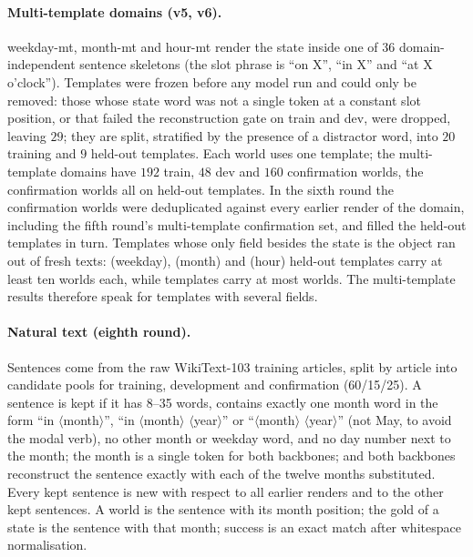 \paragraph{Multi-template domains (v5, v6).}
weekday-mt, month-mt and hour-mt render the state inside one of $36$ domain-independent sentence skeletons (the slot phrase is ``on X'',
``in X'' and ``at X o'clock''). Templates were frozen before any model run and could only be removed: those whose state word was not a single token at a constant slot position, or that failed the reconstruction gate on train and dev, were dropped, leaving $29$; they are split,
stratified by the presence of a distractor word, into $20$ training and $9$ held-out templates. Each world uses one template; the
multi-template domains have $192$ train, $48$ dev and $160$ confirmation worlds, the confirmation worlds all on held-out templates.
In the sixth round the confirmation worlds were deduplicated against every earlier render of the domain, including the fifth round's
multi-template confirmation set, and filled the held-out templates in turn. Templates whose only field besides the state is the object ran out of fresh
texts: \CLfourteenTmplWeekday{} (weekday), \CLfourteenTmplMonth{} (month) and \CLfourteenTmplHour{} (hour) held-out templates carry at
least ten worlds each, while \CLfourteenTmplSparse{} templates carry at most \CLfourteenTmplSparseMax{} worlds. The multi-template
results therefore speak for templates with several fields.

\paragraph{Natural text (eighth round).}
Sentences come from the raw WikiText-103 training articles, split by article into candidate pools for training, development and
confirmation (60/15/25). A sentence is kept if it has 8--35 words, contains exactly one month word in the form ``in $\langle$month$\rangle$'',
``in $\langle$month$\rangle$ $\langle$year$\rangle$'' or ``$\langle$month$\rangle$ $\langle$year$\rangle$'' (not May, to avoid the modal verb),
no other month or weekday word, and no day number next to the month; the month is a single token for both backbones; and both backbones
reconstruct the sentence exactly with each of the twelve months substituted. Every kept sentence is new with respect to all earlier
renders and to the other kept sentences. A world is the sentence with its month position; the gold of a state is the sentence with that
month; success is an exact match after whitespace normalisation.
